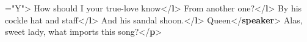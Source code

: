 \begin{shaded}
{\hspace*{1em}\hspace*{1em}\hspace*{1em}\hspace*{1em}{part}="{Y}">}\mbox{}\newline 
\hspace*{1em}\hspace*{1em}\hspace*{1em}How should I your true-love know{</\textbf{l}>}\mbox{}\newline 
\hspace*{1em}\hspace*{1em}\hspace*{1em}From another one?{</\textbf{l}>}\mbox{}\newline 
\hspace*{1em}\hspace*{1em}\hspace*{1em}By his cockle hat and staff{</\textbf{l}>}\mbox{}\newline 
\hspace*{1em}\hspace*{1em}\hspace*{1em}And his sandal shoon.{</\textbf{l}>}\mbox{}\newline 
\hspace*{1em}\hspace*{1em}\mbox{}\newline 
\hspace*{1em}\mbox{}\newline 
\hspace*{1em}\mbox{}\newline 
\hspace*{1em}\hspace*{1em}Queen{</\textbf{speaker}>}\mbox{}\newline 
\hspace*{1em}\hspace*{1em}Alas, sweet lady, what imports this song?{</\textbf{p}>}\mbox{}\newline 

\end{shaded}

